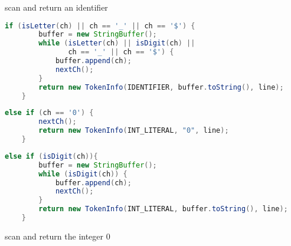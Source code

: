 \documentclass[8pt,a4paper,compress]{beamer}
\begin{document}
\begin{frame}[fragile]
\begin{overprint}
\begin{tcolorbox}[enhanced,drop shadow southwest,sharp corners,size=fbox,colback=white,fontlower=\small\ttfamily,collower=silver900]
\tcblower
\begin{minipage}[t][.25cm][t]{\textwidth}
scan and return an identifier
\end{minipage}
\end{tcolorbox}

\begin{tcolorbox}[enhanced,drop shadow southwest,sharp corners,size=fbox,colback=white,fontlower=\small\ttfamily,collower=silver900]

\begin{lstlisting}[language=Java,style=focusout]
    if (isLetter(ch) || ch == '_' || ch == '$') {
        buffer = new StringBuffer();
        while (isLetter(ch) || isDigit(ch) || 
               ch == '_' || ch == '$') {
            buffer.append(ch);
            nextCh();
        }
        return new TokenInfo(IDENTIFIER, buffer.toString(), line);
    }
\end{lstlisting}
\begin{lstlisting}[language=Java,style=focusin,backgroundcolor=\color{lime100}]
    else if (ch == '0') {
        nextCh();
        return new TokenInfo(INT_LITERAL, "0", line);
    }
\end{lstlisting}
\begin{lstlisting}[language=Java,style=focusout]
    else if (isDigit(ch)){
        buffer = new StringBuffer();
        while (isDigit(ch)) {
            buffer.append(ch);
            nextCh();
        }
        return new TokenInfo(INT_LITERAL, buffer.toString(), line);
    }
\end{lstlisting}

\tcblower
\begin{minipage}[t][.25cm][t]{\textwidth}
scan and return the integer 0
\end{minipage}
\end{tcolorbox}

\begin{tcolorbox}[enhanced,drop shadow southwest,sharp corners,size=fbox,colback=white,fontlower=\small\ttfamily,collower=silver900]


\end{tcolorbox}
\end{overprint}
\end{frame}
\end{document}
